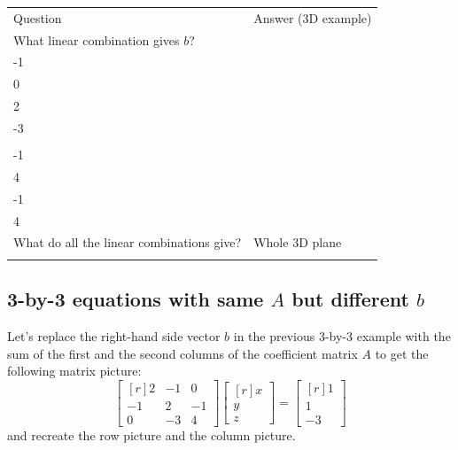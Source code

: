 \documentclass[../main.tex]{subfiles}
\begin{document}
\begin{tabular}{@{}ll@{}}
    \trule
    \textrm{Question}                         & \textrm{Answer (3D example)} \\
    \mrule
    What linear combination gives \(b\)?      & \makecell{
        \(
        0 \times
        \begin{bmatrix*}[r]
            2 \\
            -1 \\
            0
        \end{bmatrix*}
        +
        0 \times
        \begin{bmatrix*}[r]
            -1 \\
            2 \\
            -3
        \end{bmatrix*}
        \)
        \\
        \(
        + 1 \times
        \begin{bmatrix*}[r]
            0 \\
            -1 \\
            4
        \end{bmatrix*}
        =
        \begin{bmatrix*}[r]
            0 \\
            -1 \\
            4
        \end{bmatrix*}
        \)
    }                                                                        \\
    What do all the linear combinations give? & Whole 3D plane               \\
    \brule
\end{tabular}


\subsection{3-by-3 equations with same \(A\) but different \(b\)}
Let's replace the right-hand side vector \(b\) in the previous 3-by-3 example with the sum of the first and the second columns of the coefficient matrix \(A\) to get the following matrix picture:
\[
    \begin{bmatrix*}[r]
        2 & -1 & 0 \\
        -1 & 2 & -1 \\
        0 & -3 & 4
    \end{bmatrix*}
    \begin{bmatrix*}[r]
        x \\
        y \\
        z
    \end{bmatrix*}
    =
    \begin{bmatrix*}[r]
        1 \\
        1 \\
        -3
    \end{bmatrix*}
\]
and recreate the row picture and the column picture.
\end{document}
